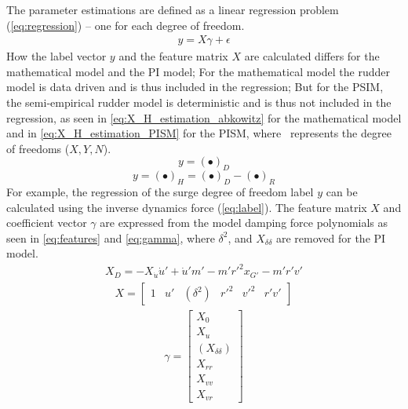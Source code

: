 The parameter estimations are defined as a linear regression problem (\autoref{eq:regression}) -- one for each degree of freedom. 
\begin{equation}\label{eq:regression}
\begin{split}y = X\gamma + \epsilon\end{split}
\end{equation}
How the label vector \(y\) and the feature matrix \(X\) are calculated differs for the mathematical model and the PI model; For the mathematical model the rudder model is data driven and is thus included in the regression; But for the PSIM, the semi-empirical rudder model is deterministic and is thus not included in the regression, as seen in \autoref{eq:X_H_estimation_abkowitz} for the mathematical model and in \autoref{eq:X_H_estimation_PISM} for the PISM, where \textbullet\ represents the degree of freedoms ($X,Y,N$).
\begin{equation}
    \label{eq:X_H_estimation_abkowitz}
    y = (\bullet)_D
\end{equation}
\begin{equation}
    \label{eq:X_H_estimation_PISM}
    y = (\bullet)_H = (\bullet)_D - (\bullet)_R
\end{equation}
For example, the regression of the surge degree of freedom label \(y\) can be calculated using the inverse dynamics force (\autoref{eq:label}). 
The feature matrix \(X\) and coefficient vector $\gamma$ are expressed from the model damping force polynomials as seen in \autoref{eq:features} and \autoref{eq:gamma}, where $\delta^2$, and $X_{\delta\delta}$ are removed for the PI model.
\begin{equation}\label{eq:label}
\begin{split}\displaystyle X_D = - X_{\dot{u}} \dot{u}' + \dot{u}' m' - m' r'^{2} x_{G'} - m' r' v'\end{split}
\end{equation}
\begin{equation}\label{eq:features}
\begin{split}\displaystyle X = \left[\begin{matrix}1 & u' & (\delta^{2}) & r'^{2} & v'^{2} & r' v'\end{matrix}\right]\end{split}
\end{equation}
\begin{equation}\label{eq:gamma}
\begin{split}\displaystyle \gamma = \left[\begin{matrix}X_{0}\\X_{u}\\(X_{\delta\delta})\\X_{rr}\\X_{vv}\\X_{vr}\end{matrix}\right]\end{split}
\end{equation}
